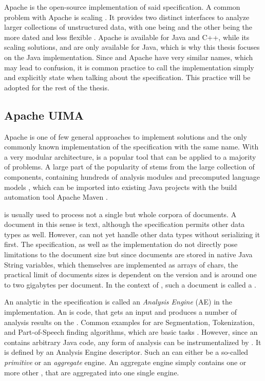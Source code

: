 Apache \uima{} is the open-source implementation of said \uima{} specification. A common problem with Apache \uima{} is scaling \cite{divita2015scaling,epstein2012making,ramakrishnan2010building}. It  provides two distinct interfaces to analyze larger collections of unstructured data, with one being \uimaas{} and the other being the more dated and less flexible \cpe{} \cite{OASIS:UIMA:2009}.
Apache \uima{} is available for Java and C++, while its scaling solutions, \uimacpe{} and \uimaas{} are only available for Java, which is why this thesis focuses on the Java implementation. Since \uima{} and Apache \uima{} have very similar names, which may lead to confusion, it is common practice to call the implementation simply \uima{} and explicitly state when talking about the specification. This practice will be adopted for the rest of the thesis.



\subsection{Apache UIMA}

Apache \uima{} is one of few general approaches to implement \nlp{} solutions and the only commonly known implementation of the specification with the same name. With a very modular architecture, \uima{} is a popular tool that can be applied to a majority of \nlp{} problems. A large part of the popularity of \uima{} stems from the large \dkpro{} collection of components, containing hundreds of analysis modules and precomputed language models \cite{eckartdecastilho-gurevych:2014:OIAF4HLT}, which can be imported into existing Java projects with the build automation tool Apache Maven \cite{dkpro}.

\uima{} is usually used to process not a single but whole corpora of documents. A document in this sense is text, although the \uima{} specification permits other data types as well. However, \uima{} can not yet handle other data types without serializing it first. The \uima{} specification, as well as the implementation do not directly pose limitations to the document size but since documents are stored in native Java String variables, which themselves are implemented as arrays of chars, the practical limit of documents sizes is dependent on the \jvm{} version and is around one to two gigabytes \cite{so:javastrings} per document. In the context of \uima{}, such a document is called a \sofa{}.

An analytic in the \uima{} specification is called an \emph{Analysis Engine} (AE) in the implementation. An \anen{} is code, that gets an input \cas{} and produces a number of analysis results on the \sofa{}. Common examples for \anens{} are Segmentation, Tokenization, and Part-of-Speech finding algorithms, which are basic \nlp{} tasks \cite{dkpro}. However, since an \anen{} contains arbitrary Java code, any form of analysis can be instrumentalized by \uima{}. It is defined by an \xml{} Analysis Engine descriptor. Such an \anen{} can either be a so-called \emph{primitive} or an \emph{aggregate} engine. An aggregate engine simply contains one or more other \anens{}, that are aggregated into one single engine.

